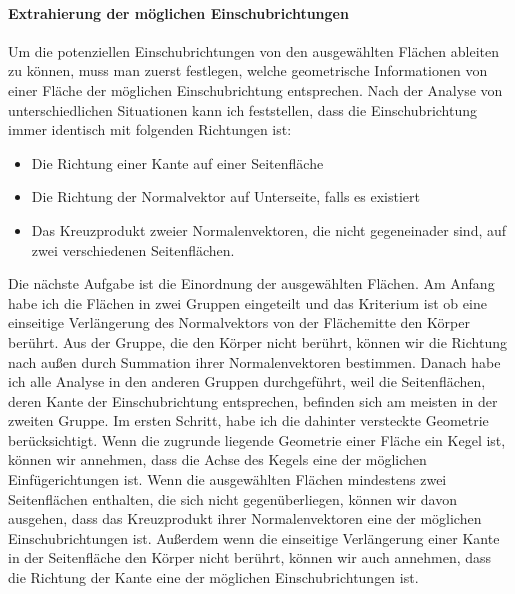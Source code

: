 \documentclass[14pt,a4paper,titlepage]{article}
\begin{document}
		\paragraph{Extrahierung der möglichen Einschubrichtungen} 
			Um die potenziellen Einschubrichtungen von den ausgewählten Flächen ableiten zu können, muss man zuerst festlegen, welche geometrische Informationen von einer Fläche der möglichen Einschubrichtung entsprechen. Nach der Analyse von unterschiedlichen Situationen kann ich feststellen, dass die Einschubrichtung immer identisch mit folgenden Richtungen ist:
			\begin{itemize}
				\item Die Richtung einer Kante auf einer Seitenfläche
				\item Die Richtung der Normalvektor auf Unterseite, falls es existiert
				\item Das Kreuzprodukt zweier Normalenvektoren, die nicht gegeneinader sind, auf zwei verschiedenen Seitenflächen. 
			\end{itemize} 
			Die nächste Aufgabe ist die Einordnung der ausgewählten Flächen. Am Anfang habe ich die Flächen in zwei Gruppen eingeteilt und das Kriterium ist ob eine einseitige Verlängerung des Normalvektors von der Flächemitte den Körper berührt. Aus der Gruppe, die den Körper nicht berührt, können wir die Richtung nach außen durch Summation ihrer Normalenvektoren bestimmen. Danach habe ich alle Analyse in den anderen Gruppen durchgeführt, weil die Seitenflächen, deren Kante der Einschubrichtung entsprechen, befinden sich am meisten in der zweiten Gruppe. 
			\bigbreak
			  Im ersten Schritt, habe ich die dahinter versteckte Geometrie berücksichtigt. Wenn die zugrunde liegende Geometrie einer Fläche ein Kegel ist, können wir annehmen, dass die Achse des Kegels eine der möglichen Einfügerichtungen ist.
			  Wenn die ausgewählten Flächen mindestens zwei Seitenflächen enthalten, die sich nicht gegenüberliegen, können wir davon ausgehen, dass das Kreuzprodukt ihrer Normalenvektoren eine der möglichen Einschubrichtungen ist. Außerdem wenn die einseitige Verlängerung einer Kante in der Seitenfläche den Körper nicht berührt, können wir auch annehmen, dass die Richtung der Kante eine der möglichen Einschubrichtungen ist.
			  
\end{document}
